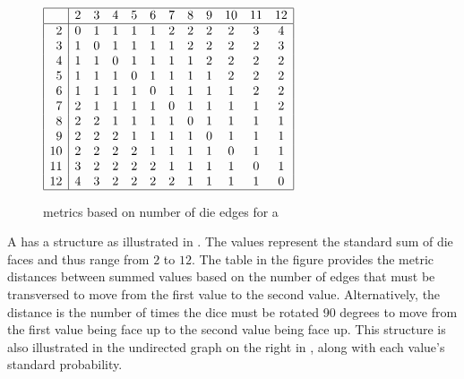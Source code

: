 \begin{tabstr}{0.75}
\begin{figure}[h]
\begin{tabstr}{0.75}
    $\begin{array}{|r|*{11}{c}|}%
       \hline
         & 2 & 3 & 4 & 5 & 6 & 7 & 8 & 9 & 10 & 11 & 12\\
       \hline
       2 & 0 & 1 & 1 & 1 & 1 & 2 & 2 & 2 & 2  & 3  & 4 \\
       3 & 1 & 0 & 1 & 1 & 1 & 1 & 2 & 2 & 2  & 2  & 3 \\
       4 & 1 & 1 & 0 & 1 & 1 & 1 & 1 & 2 & 2  & 2  & 2 \\
       5 & 1 & 1 & 1 & 0 & 1 & 1 & 1 & 1 & 2  & 2  & 2 \\
       6 & 1 & 1 & 1 & 1 & 0 & 1 & 1 & 1 & 1  & 2  & 2 \\
       7 & 2 & 1 & 1 & 1 & 1 & 0 & 1 & 1 & 1  & 1  & 2 \\
       8 & 2 & 2 & 1 & 1 & 1 & 1 & 0 & 1 & 1  & 1  & 1 \\
       9 & 2 & 2 & 2 & 1 & 1 & 1 & 1 & 0 & 1  & 1  & 1 \\
      10 & 2 & 2 & 2 & 2 & 1 & 1 & 1 & 1 & 0  & 1  & 1 \\
      11 & 3 & 2 & 2 & 2 & 2 & 1 & 1 & 1 & 1  & 0  & 1 \\
      12 & 4 & 3 & 2 & 2 & 2 & 2 & 1 & 1 & 1  & 1  & 0 \\
      \hline
    \end{array}$%
    \end{tabstr}%
  \caption{metrics based on number of die edges for a  \label{fig:pairdice}}
\end{figure}
\begin{example}
\label{ex:pairdice}
A  has a structure as illustrated in .
The values represent the standard sum of die faces and thus range from $2$ to $12$.
The table in the figure provides the metric distances between summed values based on the number of edges
that must be transversed to move from the first value to the second value.
Alternatively, the distance is the number of times the dice must be rotated 90 degrees to move from the first 
value being face up to the second value being face up.
This structure is also illustrated in the undirected graph on the right in ,
along with each value's standard probability.
\end{example}

\end{tabstr}
